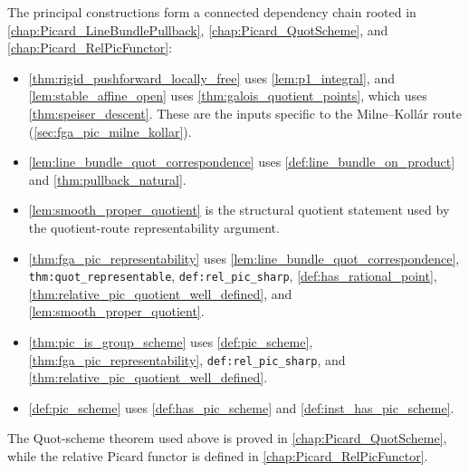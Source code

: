 The principal constructions form a connected dependency chain rooted in
\cref{chap:Picard_LineBundlePullback}, \cref{chap:Picard_QuotScheme}, and
\cref{chap:Picard_RelPicFunctor}:
\begin{itemize}
  \item \cref{thm:rigid_pushforward_locally_free} uses \cref{lem:p1_integral},
    and \cref{lem:stable_affine_open} uses
    \cref{thm:galois_quotient_points}, which uses
    \cref{thm:speiser_descent}. These are the inputs specific to the
    Milne--Koll\'ar route (\cref{sec:fga_pic_milne_kollar}).
  \item \cref{lem:line_bundle_quot_correspondence} uses
    \cref{def:line_bundle_on_product} and
    \cref{thm:pullback_natural}.
  \item \cref{lem:smooth_proper_quotient} is the structural quotient
    statement used by the quotient-route representability argument.
  \item \cref{thm:fga_pic_representability} uses
    \cref{lem:line_bundle_quot_correspondence},
    \texttt{thm:quot\_representable},
    \texttt{def:rel\_pic\_sharp},
    \cref{def:has_rational_point},
    \cref{thm:relative_pic_quotient_well_defined}, and
    \cref{lem:smooth_proper_quotient}.
  \item \cref{thm:pic_is_group_scheme} uses
    \cref{def:pic_scheme}, \cref{thm:fga_pic_representability},
    \texttt{def:rel\_pic\_sharp}, and
    \cref{thm:relative_pic_quotient_well_defined}.
  \item \cref{def:pic_scheme} uses
    \cref{def:has_pic_scheme} and \cref{def:inst_has_pic_scheme}.
\end{itemize}
The Quot-scheme theorem used above is proved in
\cref{chap:Picard_QuotScheme}, while the relative Picard functor is defined in
\cref{chap:Picard_RelPicFunctor}.
